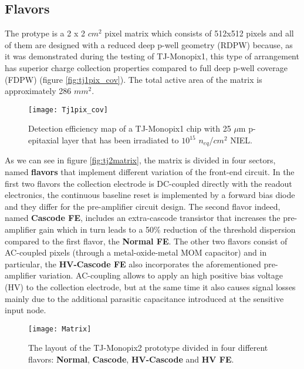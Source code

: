 


\subsection{Flavors}

The protype is a 2 x 2 $cm^{2}$ pixel matrix which consists of 512x512 pixels and all of them are designed with a reduced deep p-well geometry (RDPW) because, as it was demonstrated during the testing of TJ-Monopix1, this type of arrangement has superior charge collection properties compared to full deep p-well coverage (FDPW) (figure \vref{fig:tj1pix_cov}). The total active area of the matrix is approximately 286 $mm^{2}$. 

\begin{figure}[h!]
\centering
\texttt{[image: Tj1pix\_cov]}
\caption{Detection efficiency map of a TJ-Monopix1 chip with 25 $\mu$m p-epitaxial layer that has been irradiated to $10^{15}$ $n_{\textit{eq}}$/$cm^{2}$ NIEL.}
\label{fig:tj1pix_cov}
\end{figure}

As we can see in figure \vref{fig:tj2matrix}, the matrix is divided in four sectors, named \textbf{flavors} that implement different variation of the front-end circuit. In the first two flavors the collection electrode is DC-coupled directly with the readout electronics,  the continuous baseline reset is implemented by a forward bias diode and they differ for the pre-amplifier circuit design. The second flavor indeed, named \textbf{Cascode FE}, includes an extra-cascode transistor that increases the pre-amplifier gain which in turn leads to a 50\% reduction of the threshold dispersion compared to the first flavor, the \textbf{Normal FE}. The other two flavors consist of AC-coupled pixels (through a metal-oxide-metal MOM capacitor) and in particular, the \textbf{HV-Cascode FE} also incorporates the aforementioned pre-amplifier variation. AC-coupling allows to apply an high positive bias voltage (HV) to the collection electrode, but at the same time it also causes signal losses mainly due to the additional parasitic capacitance introduced at the sensitive input node.\\




\begin{figure}[h!]
\centering
\texttt{[image: Matrix]}
\caption{The layout of the TJ-Monopix2 prototype divided in four different flavors: \textbf{Normal}, \textbf{Cascode}, \textbf{HV-Cascode} and \textbf{HV FE}.}
\label{fig:tj2matrix}
\end{figure}


